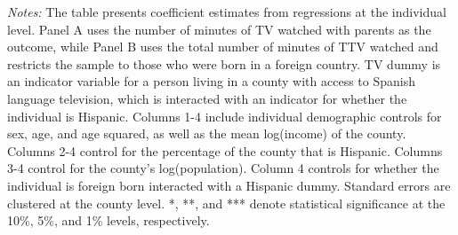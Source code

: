 \begin{table}[!htbp]
{\begin{threeparttable}
\begin{tablenotes}[flushleft]
				\item \textit{Notes:} The table presents coefficient estimates from regressions at the individual level. Panel A uses the number of minutes of TV watched with parents as the outcome, while Panel B uses the total number of minutes of TTV watched and restricts the sample to those who were born in a foreign country. TV dummy is an indicator variable for a person living in a county with access to Spanish language television, which is interacted with an indicator for whether the individual is Hispanic. Columns 1-4 include individual demographic controls for sex, age, and age squared, as well as the mean log(income) of the county. Columns 2-4 control for the percentage of the county that is Hispanic. Columns 3-4 control for the county's log(population). Column 4 controls for whether the individual is foreign born interacted with a Hispanic dummy. Standard errors are clustered at the county level. *, **, and *** denote statistical significance at the 10\%, 5\%, and 1\% levels, respectively.
			\end{tablenotes}
		\end{threeparttable}
	}
\end{table}